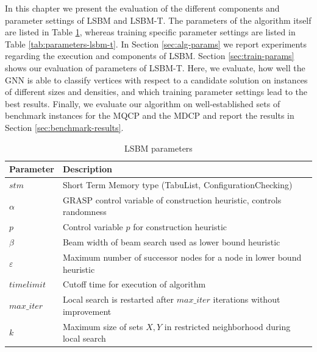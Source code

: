 \documentclass[draft,final]{vutinfth} %
\begin{document}
In this chapter we present the evaluation of the different components and parameter settings of LSBM and LSBM-T. The parameters of the algorithm itself are listed in Table \ref{tab:parameters-lsbm}, whereas training specific parameter settings are listed in Table \ref{tab:parameters-lsbm-t}. 
In Section \ref{sec:alg-params} we report experiments regarding the execution and components of LSBM. 
Section \ref{sec:train-params} shows our evaluation of parameters of LSBM-T. Here, we evaluate, how well the GNN is able to classify vertices with respect to a candidate solution on instances of different sizes and densities, and which training parameter settings lead to the best results. Finally, we evaluate our algorithm on well-established sets of benchmark instances for the MQCP and the MDCP and report the results in Section \ref{sec:benchmark-results}. 


\begin{table}
    \centering
    \begin{tabular}{ll}
        \hline
        Parameter & Description \\ \hline
        $\mathit{stm}$ & Short Term Memory type (TabuList, ConfigurationChecking) \\
        $\alpha$ & GRASP control variable of construction heuristic, controls randomness \\
        $p$ & Control variable $p$ for construction heuristic \\
        $\beta$ & Beam width of beam search used as lower bound heuristic \\
        $\varepsilon$ & Maximum number of successor nodes for a node in lower bound heuristic \\
        $\mathit{timelimit}$ & Cutoff time for execution of algorithm \\
        $\mathit{max\_iter}$ & Local search is restarted after $\mathit{max\_iter}$ iterations without improvement \\
        $k$ & Maximum size of sets $X, Y$ in restricted neighborhood during local search 
    \end{tabular}
    \caption{LSBM parameters}
    \label{tab:parameters-lsbm}
\end{table}
\end{document}
